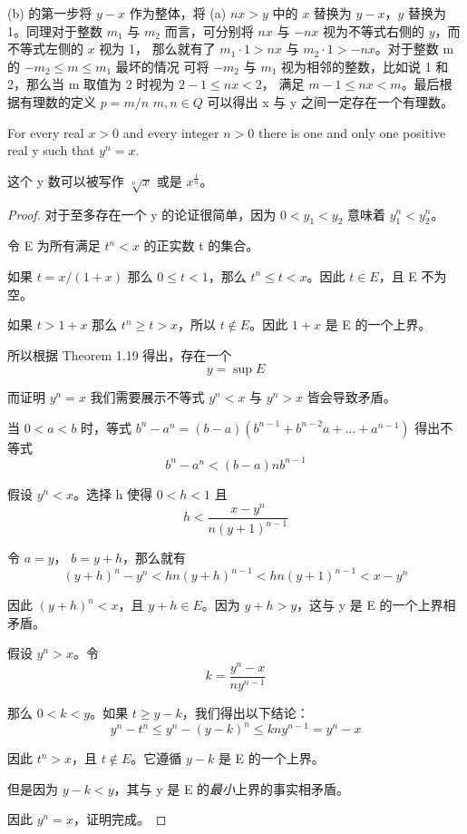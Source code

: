 \documentclass[../poma-note.tex]{subfiles}
\begin{document}
\anote
(b) 的第一步将 $y-x$ 作为整体，将 (a) $nx > y$ 中的 $x$ 替换为 $y-x$，$y$ 替换为 1。同理对于整数
$m_1$ 与 $m_2$ 而言，可分别将 $nx$ 与 $-nx$ 视为不等式右侧的 $y$，而不等式左侧的 $x$ 视为 1，
那么就有了 $m_1 \cdot 1 > nx$ 与 $m_2 \cdot 1 > -nx$。对于整数 m 的 $-m_2 \le m \le m_1$ 最坏的情况
可将 $-m_2$ 与 $m_1$ 视为相邻的整数，比如说 1 和 2，那么当 m 取值为 2 时视为 $2 - 1 \le nx < 2$，
满足 $m - 1 \le nx < m$。最后根据有理数的定义 $p=m/n$ $m,n \in Q$ 可以得出 x 与 y 之间一定存在一个有理数。

\begin{theorem}
	For every real $x>0$ and every integer $n>0$ there is one and only one positive real y such that
	$y^n=x$.
\end{theorem}

这个 y 数可以被写作 $\sqrt[n]{x}$ 或是 $x^\frac{1}{n}$。

\begin{proof}
	对于至多存在一个 y 的论证很简单，因为 $0 < y_1 < y_2$ 意味着 $y^n_1 < y^n_2$。

	令 E 为所有满足 $t^n < x$ 的正实数 t 的集合。

	如果 $t = x/(1+x)$ 那么 $0 \le t < 1$，那么 $t^n \le t < x$。因此 $t \in E$，且 E 不为空。

	如果 $t>1+x$ 那么 $t^n \ge t > x$，所以 $t \notin E$。因此 $1+x$ 是 E 的一个上界。

	所以根据 Theorem 1.19 得出，存在一个
	\[ y = \sup E\]

	而证明 $y^n = x$ 我们需要展示不等式 $y^n < x$ 与 $y^n > x$ 皆会导致矛盾。

	当  $0<a<b$ 时，等式 $b^n - a^n = (b-a)(b^{n-1} + b^{n-2}a + \dots + a^{n-1})$ 得出不等式
	\[b^n - a^n < (b-a)nb^{n-1}\]

	假设 $y^n<x$。选择 h 使得 $0<h<1$ 且
	\[h < \frac{x-y^n}{n(y+1)^{n-1}}\]

	令 $a=y$， $b=y+h$，那么就有
	\[(y+h)^n-y^n < hn(y+h)^{n-1} < hn(y+1)^{n-1} < x-y^n\]

	因此 $(y+h)^n < x$，且 $y+h \in E$。因为 $y+h>y$，这与 y 是 E 的一个上界相矛盾。

	假设 $y^n>x$。令
	\[k=\frac{y^n-x}{ny^{n-1}}\]

	那么 $0<k<y$。如果 $t \ge y-k$，我们得出以下结论：
	\[y^n - t^n \le y^n - (y - k)^n \le kny^{n-1} = y^n - x\]

	因此 $t^n > x$，且 $t \notin E$。它遵循 $y - k$ 是 E 的一个上界。

	但是因为 $y-k<y$，其与 y 是 E 的\textit{最小}上界的事实相矛盾。

	因此 $y^n=x$，证明完成。
\end{proof}
\end{document}
